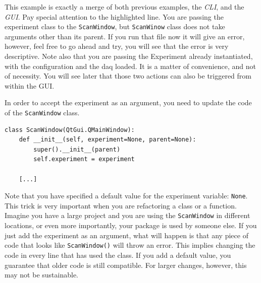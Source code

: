 This example is exactly a merge of both previous examples, the
\emph{CLI}, and the \emph{GUI}. Pay special attention to the
highlighted line. You are passing the experiment class to the
\texttt{ScanWindow}, but \texttt{ScanWinow} class does not take
arguments other than its parent. If you run that file now it will give
an error, however, feel free to go ahead and try, you will see that the
error is very descriptive. Note also that you are passing the Experiment
already instantiated, with the configuration and the daq loaded. It is a
matter of convenience, and not of necessity. You will see later that
those two actions can also be triggered from within the {GUI}.

In order to accept the experiment as an argument, you need to update the
code of the \texttt{ScanWindow} class.

\begin{verbatim}
class ScanWindow(QtGui.QMainWindow):
    def __init__(self, experiment=None, parent=None):
        super().__init__(parent)
        self.experiment = experiment

    [...]
\end{verbatim}

Note that you have specified a default value for the experiment
variable: \texttt{None}. This trick is very important when you are
refactoring a class or a function. Imagine you have a large project and
you are using the \texttt{ScanWindow} in different locations, or even
more importantly, your package is used by someone else. If you just add
the experiment as an argument, what will happen is that any piece of
code that looks like \texttt{ScanWindow()} will throw an error. This
implies changing the code in every line that has used the class. If you
add a default value, you guarantee that older code is still compatible.
For larger changes, however, this may not be sustainable.




